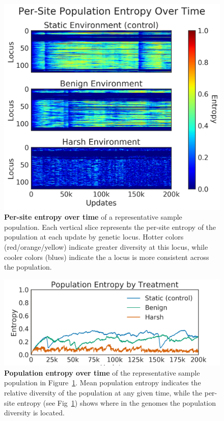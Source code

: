 \documentclass[10pt,letterpaper,final]{article}
\begin{document}
	\begin{figure}[!h]
	\includegraphics[width=0.75\columnwidth]{figures/CE/by_site_entropy}
	\caption{\textbf{Per-site entropy over time} of a representative sample population. Each vertical slice represents the per-site entropy of the population at each update by genetic locus. Hotter colors (red/orange/yellow) indicate greater diversity at this locus, while cooler colors (blues) indicate the a locus is more consistent across the population.   %
	}\label{fig:by-site-entropy}
	\end{figure}

	\begin{figure}[!h]
	\includegraphics[width=0.75\columnwidth]{figures/CE/population_entropy}
	\caption{\textbf{Population entropy over time} of the representative sample population in Figure~\ref{fig:by-site-entropy}. Mean population entropy indicates the relative diversity of the population at any given time, while the per-site entropy (see Fig~\ref{fig:by-site-entropy}) shows where in the genomes the population diversity is located.   %
	}\label{fig:population-entropy}
	\end{figure}
\end{document}
